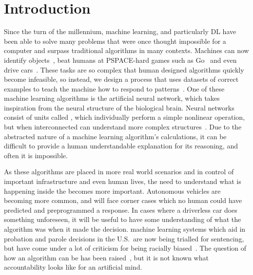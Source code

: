 
\chapter{Introduction}

Since the turn of the millennium, machine learning, and particularly \acl{DL} have been able to solve many problems that were once thought impossible for a computer and surpass traditional algorithms in many contexts.
Machines can now identify objects~\autocite{li2018}, beat humans at PSPACE-hard games such as Go~\autocite{chao2018} and even drive cars~\autocite{gerla2014}.
These tasks are so complex that human designed algorithms quickly become infeasible, so instead, we design a process that uses datasets of correct examples to teach the machine how to respond to patterns~\autocite[1]{murphy2012}.
One of these machine learning algorithms is the artificial neural network, which takes inspiration from the neural structure of the biological brain.
Neural networks consist of units called , which individually perform a simple nonlinear operation, but when interconnected can understand more complex structures~\autocite[436]{lecun2015}.
Due to the abstracted nature of a machine learning algorithm's calculations, it can be difficult to provide a human understandable explanation for its reasoning, and often it is impossible.

As these algorithms are placed in more real world scenarios and in control of important infrastructure and even human lives, the need to understand what is happening inside the  becomes more important.
Autonomous vehicles are becoming more common, and will face corner cases which no human could have predicted and preprogrammed a response.
In cases where a driverless car does something unforeseen, it will be useful to have some understanding of what the algorithm was  when it made the decision.
machine learning systems which aid in probation and parole decisions in the U.S.\ are now being trialled for sentencing, but have come under a lot of criticism for being racially biased~\autocite{christin2015}.
The question of how an algorithm can be  has been raised~\autocite[9]{christin2015}, but it is not known what accountability looks like for an artificial mind.
